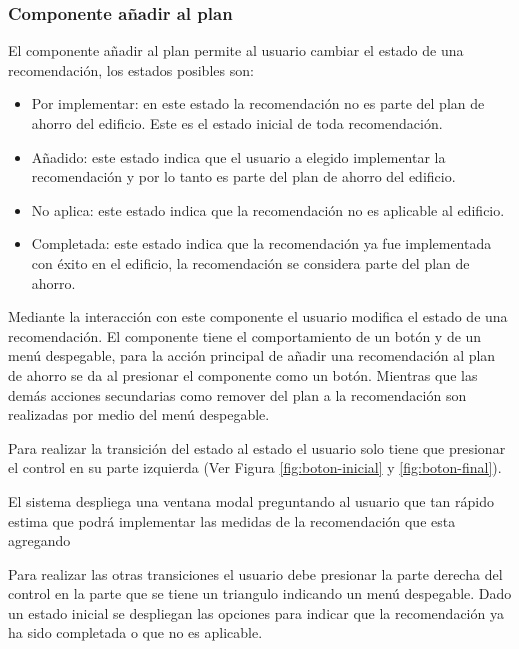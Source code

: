 \subsubsection{Componente añadir al plan}

El componente añadir al plan permite al usuario cambiar el estado
de una recomendación, los estados posibles son:

\begin{itemize}
\item Por implementar: en este estado la recomendación no es parte
  del plan de ahorro del edificio. Este es el estado inicial de toda
  recomendación.
\item Añadido: este estado indica que el usuario a elegido implementar la
  recomendación y por lo tanto es parte del plan de ahorro del edificio.
\item No aplica: este estado indica que la recomendación no es aplicable al edificio.
\item Completada: este estado indica que la recomendación ya fue implementada
  con éxito en el edificio, la recomendación se considera parte del
  plan de ahorro.
\end{itemize}

Mediante la interacción con este componente el usuario modifica el estado
de una recomendación. El componente tiene el comportamiento de un botón y
de un menú despegable, para la acción principal de añadir una recomendación
al plan de ahorro se da al presionar el componente como un botón. Mientras
que las demás acciones secundarias como remover del plan a la recomendación
son realizadas por medio del menú despegable.

Para realizar la transición del estado  al estado
 el usuario solo tiene que presionar el control en su parte
izquierda (Ver Figura \ref{fig:boton-inicial} y \ref{fig:boton-final}).

El sistema despliega una ventana modal preguntando al usuario que tan
rápido estima que podrá implementar las medidas de la recomendación
que esta agregando


Para realizar las otras transiciones el usuario debe presionar la parte derecha
del control en la parte que se tiene un triangulo indicando un menú despegable.
Dado un estado inicial se despliegan las opciones para indicar que la
recomendación ya ha sido completada o que no es aplicable.

